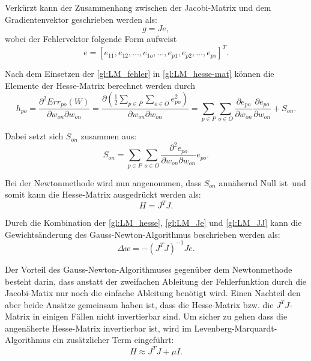 Verkürzt kann der Zusammenhang zwischen der Jacobi-Matrix und dem Gradientenvektor geschrieben werden als:
\begin{equation}
g = Je,
\label{gl:LM_Je}
\end{equation}
wobei der Fehlervektor folgende Form aufweist
\begin{equation}
e= \left [ e_{11}, e_{12}, \dots, e_{1o}, \dots, e_{p1}, e_{p2}, \dots, e_{po} \right ]^T.
\label{gl:LM_bp}
\end{equation}

Nach dem Einsetzen der \autoref{gl:LM_fehler} in \autoref{gl:LM_hesse-mat} können die Elemente der Hesse-Matrix berechnet werden durch
\begin{equation}
h_{po} = \frac{\partial^2 Err_{po}(W)}{\partial w_{on} \partial w_{on}} = \frac{\partial \left (\frac{1}{2} \sum_{p \in P} \sum_{o \in O} e_{po}^2 \right )}{\partial w_{on} \partial w_{on}} 
=
\sum_{p \in P} \sum_{o \in O} \frac{\partial e_{po}}{\partial w_{on}} \frac{\partial e_{po}}{\partial w_{on}} + S_{on}.
\label{gl:LM-h}
\end{equation}

Dabei setzt sich $S_{on}$ zusammen aus:
\begin{equation}
S_{on} = \sum_{p \in P} \sum_{o \in O} \frac{\partial^2 e_{po}}{\partial w_{on} \partial w_{on}} e_{po}.
\label{gl:LM_S}
\end{equation}

Bei der Newtonmethode wird nun angenommen, dass $S_{on}$ annähernd Null ist\, und somit kann die Hesse-Matrix ausgedrückt werden als:
\begin{equation}
H = J^T J.
\label{gl:LM_JJ}
\end{equation}

Durch die Kombination der \autoref{gl:LM_hesse}, \autoref{gl:LM_Je} und \autoref{gl:LM_JJ} kann die Gewichtsänderung des Gauss-Newton-Algorithmus beschrieben werden als:
\begin{equation}
\Delta w =-(J^T J)^{-1} J e.
\label{gl:LM_GNA}
\end{equation}

Der Vorteil des Gauss-Newton-Algorithmuses gegenüber dem Newtonmethode besteht darin, dass anstatt der zweifachen Ableitung der Fehlerfunktion durch die Jacobi-Matix nur noch die einfache Ableitung benötigt wird. Einen Nachteil den aber beide Ansätze gemeinsam haben ist, dass die Hesse-Matrix bzw. die $J^T J$-Matrix in einigen Fällen nicht invertierbar sind. Um sicher zu gehen dass die angenäherte Hesse-Matrix invertierbar ist, wird im Levenberg-Marquardt-Algorithmus ein zusätzlicher Term eingeführt:
\begin{equation}
H \approx J^T J + \mu I.
\label{gl:LM_lm-H}
\end{equation}

